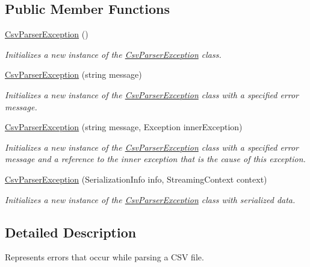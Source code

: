 \subsection*{Public Member Functions}
\begin{DoxyCompactItemize}
\item 
\hyperlink{a00049_a4a87a8cbca18790562bab5f571e6e87b}{Csv\-Parser\-Exception} ()
\begin{DoxyCompactList}\small\item\em Initializes a new instance of the \hyperlink{a00049}{Csv\-Parser\-Exception} class. \end{DoxyCompactList}\item 
\hyperlink{a00049_a6ac692a1b7bb39afc66a7c701963e9c2}{Csv\-Parser\-Exception} (string message)
\begin{DoxyCompactList}\small\item\em Initializes a new instance of the \hyperlink{a00049}{Csv\-Parser\-Exception} class with a specified error message. \end{DoxyCompactList}\item 
\hyperlink{a00049_a62b6bf7ba1ab79737a049a6ced4555d4}{Csv\-Parser\-Exception} (string message, Exception inner\-Exception)
\begin{DoxyCompactList}\small\item\em Initializes a new instance of the \hyperlink{a00049}{Csv\-Parser\-Exception} class with a specified error message and a reference to the inner exception that is the cause of this exception. \end{DoxyCompactList}\item 
\hyperlink{a00049_a3ce8a09ae6e88787d47f47a108d33f21}{Csv\-Parser\-Exception} (Serialization\-Info info, Streaming\-Context context)
\begin{DoxyCompactList}\small\item\em Initializes a new instance of the \hyperlink{a00049}{Csv\-Parser\-Exception} class with serialized data. \end{DoxyCompactList}\end{DoxyCompactItemize}


\subsection{Detailed Description}
Represents errors that occur while parsing a C\-S\-V file. 



